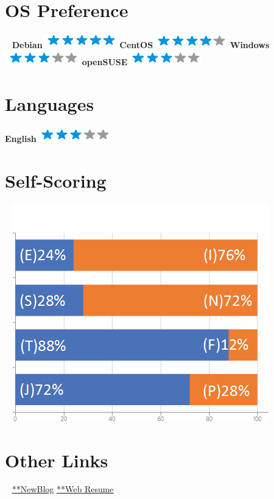\documentclass[]{friggeri-cv}
\begin{document}
\begin{aside}
~
~ 
 \section{OS Preference}
  ~
    \textbf{Debian}\includegraphics[scale=0.40]{img/5stars.png}
    \textbf{CentOS}\includegraphics[scale=0.40]{img/4stars.png}
    \textbf{Windows}\includegraphics[scale=0.40]{img/3stars.png}
    \textbf{openSUSE}\includegraphics[scale=0.40]{img/3stars.png}
  \section{Languages}
    \textbf{English}\includegraphics[scale=0.40]{img/3stars.png}
  ~    
  \section{Self-Scoring}
    ~
    \includegraphics[scale=0.32]{img/personal.png}
    ~
  \section{Other Links}
    ~
    {\href{https://blog.mxuan.me}{**NewBlog}}
    {\href{https://resume.mxuan.me}{**Web Resume}}
   ~
   ~
\end{aside}
\end{document}
